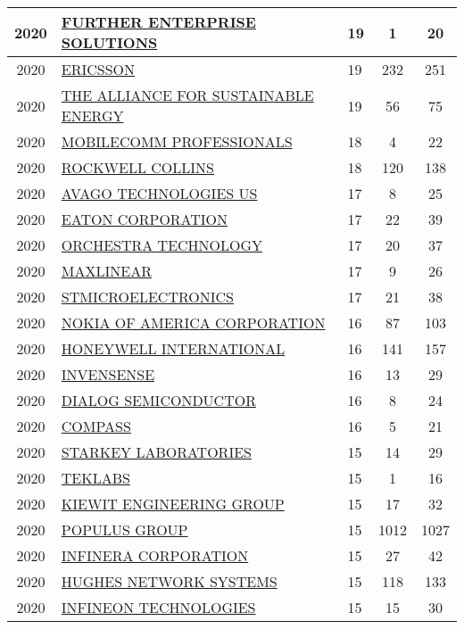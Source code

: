 \documentclass{article}%
\begin{document}
\begin{longtable}{c|p{20em}|p{5em}|c|c}
\hline%
2020&\hyperref[subsec:FURTHERENTERPRISESOLUTIONS]{FURTHER ENTERPRISE SOLUTIONS}&19&1&20\\%
\hline%
2020&\hyperref[subsec:ERICSSON]{ERICSSON}&19&232&251\\%
\hline%
2020&\hyperref[subsec:THEALLIANCEFORSUSTAINABLEENERGY]{THE ALLIANCE FOR SUSTAINABLE ENERGY}&19&56&75\\%
\hline%
2020&\hyperref[subsec:MOBILECOMMPROFESSIONALS]{MOBILECOMM PROFESSIONALS}&18&4&22\\%
\hline%
2020&\hyperref[subsec:ROCKWELLCOLLINS]{ROCKWELL COLLINS}&18&120&138\\%
\hline%
2020&\hyperref[subsec:AVAGOTECHNOLOGIESUS]{AVAGO TECHNOLOGIES US}&17&8&25\\%
\hline%
2020&\hyperref[subsec:EATONCORPORATION]{EATON CORPORATION}&17&22&39\\%
\hline%
2020&\hyperref[subsec:ORCHESTRATECHNOLOGY]{ORCHESTRA TECHNOLOGY}&17&20&37\\%
\hline%
2020&\hyperref[subsec:MAXLINEAR]{MAXLINEAR}&17&9&26\\%
\hline%
2020&\hyperref[subsec:STMICROELECTRONICS]{STMICROELECTRONICS}&17&21&38\\%
\hline%
2020&\hyperref[subsec:NOKIAOFAMERICACORPORATION]{NOKIA OF AMERICA CORPORATION}&16&87&103\\%
\hline%
2020&\hyperref[subsec:HONEYWELLINTERNATIONAL]{HONEYWELL INTERNATIONAL}&16&141&157\\%
\hline%
2020&\hyperref[subsec:INVENSENSE]{INVENSENSE}&16&13&29\\%
\hline%
2020&\hyperref[subsec:DIALOGSEMICONDUCTOR]{DIALOG SEMICONDUCTOR}&16&8&24\\%
\hline%
2020&\hyperref[subsec:COMPASS]{COMPASS}&16&5&21\\%
\hline%
2020&\hyperref[subsec:STARKEYLABORATORIES]{STARKEY LABORATORIES}&15&14&29\\%
\hline%
2020&\hyperref[subsec:TEKLABS]{TEKLABS}&15&1&16\\%
\hline%
2020&\hyperref[subsec:KIEWITENGINEERINGGROUP]{KIEWIT ENGINEERING GROUP}&15&17&32\\%
\hline%
2020&\hyperref[subsec:POPULUSGROUP]{POPULUS GROUP}&15&1012&1027\\%
\hline%
2020&\hyperref[subsec:INFINERACORPORATION]{INFINERA CORPORATION}&15&27&42\\%
\hline%
2020&\hyperref[subsec:HUGHESNETWORKSYSTEMS]{HUGHES NETWORK SYSTEMS}&15&118&133\\%
\hline%
2020&\hyperref[subsec:INFINEONTECHNOLOGIES]{INFINEON TECHNOLOGIES}&15&15&30\\%

\end{longtable}
\end{document}
